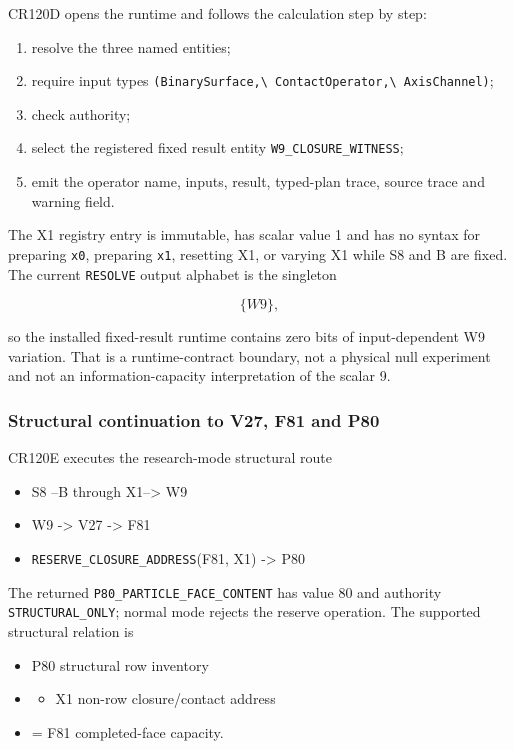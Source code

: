 CR120D opens the runtime and follows the calculation step by step:

\begin{enumerate}
\def\labelenumi{\arabic{enumi}.}
\tightlist
\item
  resolve the three named entities;
\item
  require input types
  \nolinkurl{(BinarySurface,\ ContactOperator,\ AxisChannel)};
\item
  check authority;
\item
  select the registered fixed result entity
  \texttt{W9\_CLOSURE\_WITNESS};
\item
  emit the operator name, inputs, result, typed-plan trace, source trace
  and warning field.
\end{enumerate}

The X1 registry entry is immutable, has scalar value 1 and has no syntax
for preparing \texttt{x0}, preparing \texttt{x1}, resetting X1, or
varying X1 while S8 and B are fixed. The current \texttt{RESOLVE} output
alphabet is the singleton

\[
\{W9\},
\]

so the installed fixed-result runtime contains zero bits of
input-dependent W9 variation. That is a runtime-contract boundary, not a
physical null experiment and not an information-capacity interpretation
of the scalar 9.

\subsubsection{Structural continuation to V27, F81 and
P80}\label{viii-ch05-structural-continuation-to-v27-f81-and-p80}

CR120E executes the research-mode structural route

\begin{itemize}
\tightlist
\item
  S8 --B through X1--\textgreater{} W9
\item
  W9 -\textgreater{} V27 -\textgreater{} F81
\item
  \nolinkurl{RESERVE_CLOSURE_ADDRESS}(F81, X1) -\textgreater{} P80
\end{itemize}

The returned \nolinkurl{P80_PARTICLE_FACE_CONTENT} has value 80 and
authority \texttt{STRUCTURAL\_ONLY}; normal mode rejects the reserve
operation. The supported structural relation is

\begin{itemize}
\tightlist
\item
  P80 structural row inventory
\item
  \begin{itemize}
  \tightlist
  \item
    X1 non-row closure/contact address
  \end{itemize}
\item
  = F81 completed-face capacity.
\end{itemize}

